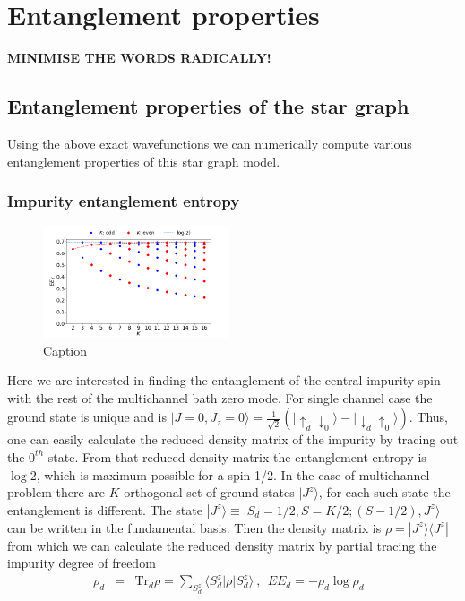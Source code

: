 \documentclass[reprint,prb,superscriptaddress]{revtex4-2}
\begin{document}
\section{Entanglement properties}
\textbf{MINIMISE THE WORDS RADICALLY!}
\subsection{Entanglement properties of the star graph}
\noindent Using the above exact wavefunctions we can numerically compute various entanglement properties of this star graph model. 

\subsubsection{Impurity entanglement entropy}
\begin{figure}[!htpb]
\centering
\includegraphics[width=0.49\textwidth]{plt/EE_multi_channel_ANN.png}
\caption{Caption }
\label{fig:EE_d}
\end{figure}
\noindent Here we are interested in finding the entanglement of the central impurity spin with the rest of the multichannel bath zero mode. For single channel case the ground state is unique and is $|J=0,J_z=0 \rangle = \frac{1}{\sqrt{2}} (|\uparrow_{d}\downarrow_0\rangle -|\downarrow_d \uparrow_0\rangle)$. Thus, one can easily calculate the reduced density matrix of the impurity by tracing out the $0^{th}$ state. From that reduced density matrix the entanglement entropy is $\log 2$, which is maximum possible for a spin-1/2. In the case of multichannel problem there are $K$ orthogonal set of ground states $|J^z\rangle$, for each such state the entanglement is different. The state $|J^z\rangle \equiv |S_d=1/2,S=K/2;(S-1/2),J^z\rangle$ can be written in the fundamental basis. 
Then the density matrix is $\rho=|J^z\rangle\langle J^z|$ from which we can calculate the reduced density matrix by partial tracing the impurity degree of freedom 
\begin{eqnarray}
\rho_{d}&=& \textrm{Tr}_{d} \rho=\sum_{S_d^z} \langle S_d^z| \rho | S^z_d\rangle ~,~~EE_d = -\rho_{d} \log \rho_{d}~~~
\end{eqnarray}
\end{document}
